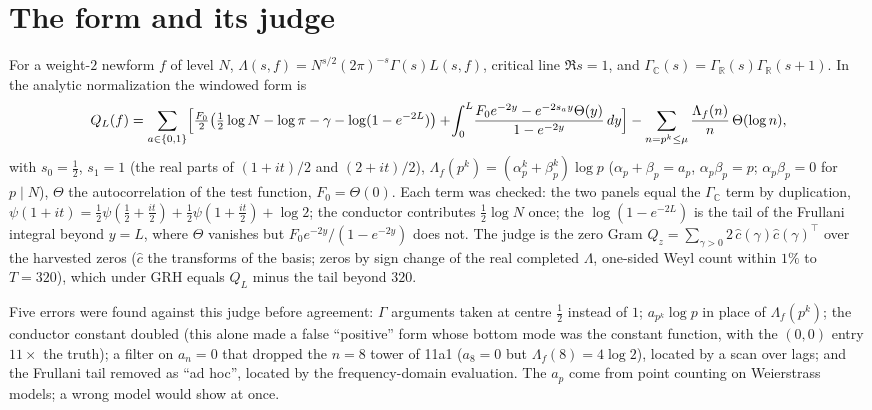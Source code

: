 \documentclass[11pt]{article}
\begin{document}
\section{The form and its judge}
For a weight-$2$ newform $f$ of level $N$, $\Lambda(s,f)=N^{s/2}(2\pi)^{-s}\Gamma(s)L(s,f)$, critical line $\Re s=1$, and $\Gamma_{\mathbb C}(s)=\Gamma_{\mathbb R}(s)\Gamma_{\mathbb R}(s+1)$. In the analytic normalization the windowed form is
\[
Q_L(f)=\sum_{a\in\{0,1\}}\Bigl[\tfrac{F_0}{2}\bigl(\tfrac12\log N-\log\pi-\gamma-\log(1-e^{-2L})\bigr)+\!\int_0^L\!\frac{F_0e^{-2y}-e^{-2s_a y}\Theta(y)}{1-e^{-2y}}\,dy\Bigr]-\sum_{n=p^k\le\mu}\frac{\Lambda_f(n)}{n}\,\Theta(\log n),
\]
with $s_0=\tfrac12$, $s_1=1$ (the real parts of $(1+it)/2$ and $(2+it)/2$), $\Lambda_f(p^k)=(\alpha_p^k+\beta_p^k)\log p$ ($\alpha_p+\beta_p=a_p$, $\alpha_p\beta_p=p$; $\alpha_p\beta_p=0$ for $p\mid N$), $\Theta$ the autocorrelation of the test function, $F_0=\Theta(0)$. Each term was checked: the two panels equal the $\Gamma_{\mathbb C}$ term by duplication, $\psi(1+it)=\tfrac12\psi(\tfrac12+\tfrac{it}2)+\tfrac12\psi(1+\tfrac{it}2)+\log2$; the conductor contributes $\tfrac12\log N$ once; the $\log(1-e^{-2L})$ is the tail of the Frullani integral beyond $y=L$, where $\Theta$ vanishes but $F_0e^{-2y}/(1-e^{-2y})$ does not. The judge is the zero Gram $Q_z=\sum_{\gamma>0}2\,\hat c(\gamma)\hat c(\gamma)^{\!\top}$ over the harvested zeros ($\hat c$ the transforms of the basis; zeros by sign change of the real completed $\Lambda$, one-sided Weyl count within $1\%$ to $T=320$), which under GRH equals $Q_L$ minus the tail beyond $320$.

Five errors were found against this judge before agreement: $\Gamma$ arguments taken at centre $\tfrac12$ instead of $1$; $a_{p^k}\log p$ in place of $\Lambda_f(p^k)$; the conductor constant doubled (this alone made a false ``positive'' form whose bottom mode was the constant function, with the $(0,0)$ entry $11\times$ the truth); a filter on $a_n=0$ that dropped the $n=8$ tower of 11a1 ($a_8=0$ but $\Lambda_f(8)=4\log2$), located by a scan over lags; and the Frullani tail removed as ``ad hoc'', located by the frequency-domain evaluation. The $a_p$ come from point counting on Weierstrass models; a wrong model would show at once.
\end{document}
